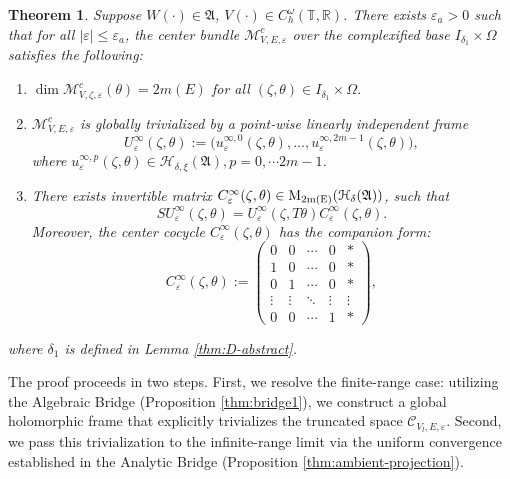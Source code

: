 \documentclass[reqno,11pt]{amsart}
\newtheorem{theorem}{Theorem}[section]
\newcommand{\R}{{\mathbb R}}
\newcommand{\T}{{\mathbb T}}
\begin{document}
\begin{theorem}\label{thm:centert}
Suppose $W(\cdot)\in \mathfrak A$, $V(\cdot)\in C_h^{\omega}(\T,\R)$. There exists $\varepsilon_{a} > 0$ such that for all $|\varepsilon| \le \varepsilon_{a}$, the center bundle $\boldsymbol{\mathcal M}^c_{V,E,\varepsilon}$ over the complexified base $I_{\delta_{1}}\times \Omega$ satisfies the following:
\begin{enumerate}
    \item $\dim \mathcal M_{V,\zeta,\varepsilon}^c(\theta) = 2m(E)$ for all $(\zeta,\theta) \in I_{\delta_1} \times \Omega$.
    \item $\boldsymbol{\mathcal M}^c_{V,E,\varepsilon}$ is globally trivialized  by a point-wise linearly independent  frame
    $$
    U_\varepsilon^{\infty}(\zeta,\theta) := \bigl( u_{\varepsilon}^{\infty,0}(\zeta,\theta), \dots, u_{\varepsilon}^{\infty,2m-1}(\zeta,\theta) \bigr),
    $$
    where $u_{\varepsilon}^{\infty,p}(\zeta,\theta) \in \mathcal H_{\delta,\xi}(\mathfrak A),p=0,\cdots 2m-1 $.
    \item  There exists invertible matrix  $C_\varepsilon^{\infty }(\zeta,\theta) \in\rm M_{2m(E)}(\mathcal H_\delta(\mathfrak A))$, such that 
     $$
S U^{\infty}_\varepsilon(\zeta,\theta) = U^{\infty}_\varepsilon(\zeta,T\theta) C_{\varepsilon}^{\infty}(\zeta,\theta).
    $$
    Moreover, the center cocycle $C_{\varepsilon}^{\infty}(\zeta,\theta)$ has the companion form:
   \begin{equation}
\label{eq:comicc}
C_{\varepsilon}^{\infty}(\zeta,\theta):=
\begin{pmatrix}
0 & 0 & \cdots & 0 & *\\
1 & 0 & \cdots & 0 & *\\
0 & 1 & \cdots & 0 & *\\
\vdots & \vdots & \ddots & \vdots & \vdots\\
0 & 0 & \cdots & 1 & *
\end{pmatrix},
\end{equation}
\end{enumerate}
where $\delta_1$ is defined in  Lemma \ref{thm:D-abstract}.
\end{theorem}






The proof proceeds in two steps. First, we resolve the finite-range case: utilizing the Algebraic Bridge (Proposition \ref{thm:bridge1}), we construct a global holomorphic frame that explicitly trivializes the truncated space $\mathcal{C}_{V_l,E,\varepsilon}$. Second, we pass this trivialization to the infinite-range limit via the uniform convergence established in the Analytic Bridge (Proposition \ref{thm:ambient-projection}).
\end{document}
